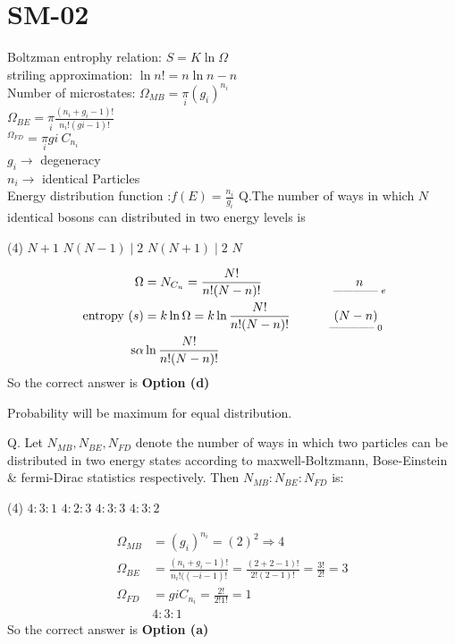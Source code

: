 \chapter{SM-02}
Boltzman entrophy relation: $S=K \ln \Omega$\\
striling approximation: $\ln n !=n \ln n-n$\\
Number of microstates: 
$\Omega_{M B}=\underset{i}{\pi}\left(g_{i}\right)^{n_{i}}$\\
$\Omega_{B E}=\underset{i}{\pi}\frac{\left(n_{i}+g_{i}-1\right) !}{n_{i} !(g i-1) !}$\\
${ }^{\Omega_{F D}}=\underset{i}{\pi}{g i }\  C_{n_{i}}$\\
$g_{i} \rightarrow$ degeneracy\\
$n_{i} \rightarrow$ identical Particles\\
Energy distribution function :$f(E)=\frac{n_{i}}{g_{i}}$
Q.The number of ways in which $N$ identical bosons can distributed in two energy levels is 
 \begin{tasks}(4)
	\task[\textbf{a.}] $N+1$
	\task[\textbf{b.}]$N(N-1) \mid 2$
	\task[\textbf{c.}]$N(N+1) \mid 2$
	\task[\textbf{d.}]$N$ 
\end{tasks}
\begin{answer}
	\begin{align*}
	\Omega&=N_ {C_n}=\frac{N !}{n !(N-n) !}\hspace{2cm}\underset{\text{-------------- }e}{n}\\
	\text { entropy }(s)&=k \ln \Omega=k \ln \frac{N !}{n !(N-n) !}\hspace{1.1cm}\underset{\text{-------------- } 0}{(N-n)}\\
	\operatorname{s\alpha } &\ln \frac{N !}{n !(N-n) !}
	\end{align*}
		So the correct answer is \textbf{Option (d)}
\end{answer}
\begin{note}
	Probability will be maximum for equal distribution.
\end{note}
Q. Let $N_{M B}, N_{B E}, N_{F D}$ denote the number of ways in which two particles can be distributed in two energy states according to maxwell-Boltzmann, Bose-Einstein \& fermi-Dirac statistics respectively. Then $N_{M B}: N_{B E}: N_{F D}$ is:
 \begin{tasks}(4)
	\task[\textbf{a.}]$4: 3: 1$
	\task[\textbf{b.}] $4: 2: 3$
	\task[\textbf{c.}]$4: 3: 3$
	\task[\textbf{d.}] $4: 3: 2$
\end{tasks}
\begin{answer}
	\begin{align*}
	\Omega_{M B}&=\left(g_{i}\right)^{n_{i}}=(2)^{2} \Rightarrow 4 \\
	\Omega_{B E}&=\frac{\left(n_{i}+g_{i}-1\right) !}{n_{i} !((-i-1) !}=\frac{(2+2-1) !}{2 !(2-1) !}=\frac{3 !}{2 !}=3\\
	\Omega_{F D}&=g i C_{n_{i}}=\frac{2 !}{2 ! 1 !}=1\\
	&4:3:1
	\end{align*}
	So the correct answer is \textbf{Option (a)}
\end{answer}
